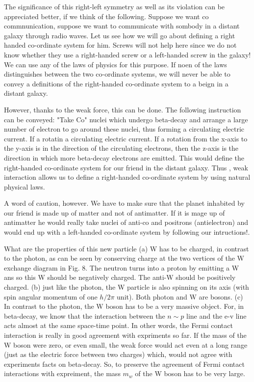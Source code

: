 The significance of this right-left symmetry as well as its violation can be appreciated better, if we think of the following. Suppose we want co commnunication, suppose we want to communicate with sombody in a distant galaxy through radio waves. Let us see how we will go about defining a right handed co-ordinate system for him. Screws will not help here since we do not know whether they use a right-handed screw or a left-handed screw in the galaxy! We can use any of the laws of physics for this purpose. If noen of the laws distinguishes between the two co-ordinate systems, we will never be able to convey a definitions of the right-handed co-ordinate system to a beign in a distant galaxy.

However, thanks to the weak force, this can be done. The following instruction can be conveyed: "Take Co" nuclei which undergo beta-decay and arrange a large number of electron to go  around these nuclei, thus forming a circulating electric current. If a rotatin a circulating electric current. If a rotation from the x-axis to the y-axis is in the direction of the circulating electrons, then the z-axis is the direction in which more beta-decay electrons are emitted. This would define the right-handed co-ordinate system for our friend in the distant galaxy. Thus , weak interaction allows us to define a right-handed co-ordinate system by using natural physical laws.

A word of caution, however. We have to make sure that the planet inhabited by our friend is made up of matter and not of antimatter. If it is mage up of antimatter he would really take nuclei of anti-co and positrons (antielectron) and would end up with a left-handed co-ordinate system by following our intructions!.

What are the properties of this new particle (a) W has to be charged, in contrast to the photon, as can be seen by conserving charge at the two vertices of the W exchange diagram in Fig. 8. The neutron turns into a proton by emitting a W ans so this W should be negatively charged. The anti-W should be positively charged. (b) just like the photon, the W particle is also spinning on its axis (with spin angular momentum of one $h/2\pi$ unit). Both photon and W are bosons. (c) In contrast to the photon, the W boson has to be a very massive object. For, in beta-decay, we know that  the interaction between the $n\sim p$ line and the e-v line acts almost at the same space-time point. In other words, the Fermi contact interaction is really in good agreement with expriments so far. If the mass of the W boson were zero, or even small, the weak force would act even at a long range (just as the electric force between two charges) which, would not agree with experiments facts on beta-decay. So, to preserve the agreement of Fermi contact interactions with expreiment, the mass $m_{w}$ of the W boson has to be very large.

